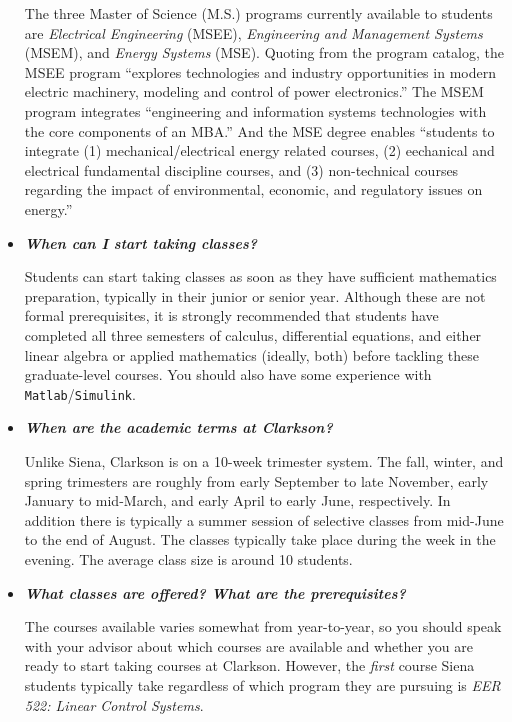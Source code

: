\documentclass[12pt]{article}
\begin{document}
\begin{itemize}
{  The three Master of Science (M.S.) programs currently available to students
  are {\em Electrical Engineering} (MSEE), {\em Engineering and Management
    Systems} (MSEM), and {\em Energy Systems} (MSE).  Quoting from the program
  catalog, the MSEE program ``explores technologies and industry opportunities
  in modern electric machinery, modeling and control of power electronics.''
  The MSEM program integrates ``engineering and information systems technologies
  with the core components of an MBA.''  And the MSE degree enables ``students
  to integrate (1) mechanical/electrical energy related courses, (2) eechanical
  and electrical fundamental discipline courses, and (3) non-technical courses
  regarding the impact of environmental, economic, and regulatory issues on
  energy.''}

\item{{\bf {\em When can I start taking classes?}}

  Students can start taking classes as soon as they have sufficient mathematics
  preparation, typically in their junior or senior year.  Although these are not
  formal prerequisites, it is strongly recommended that students have completed
  all three semesters of calculus, differential equations, and either linear
  algebra or applied mathematics (ideally, both) before tackling these
  graduate-level courses.  You should also have some experience with {\tt
    Matlab}/{\tt Simulink}.}

\item{{\bf {\em When are the academic terms at Clarkson?}}

  Unlike Siena, Clarkson is on a 10-week trimester system.  The fall, winter,
  and spring trimesters are roughly from early September to late November, early
  January to mid-March, and early April to early June, respectively.  In
  addition there is typically a summer session of selective classes from
  mid-June to the end of August.  The classes typically take place during the
  week in the evening.  The average class size is around 10 students.}

\item{{\bf {\em What classes are offered?  What are the prerequisites?}}

  The courses available varies somewhat from year-to-year, so you should speak
  with your advisor about which courses are available and whether you are ready
  to start taking courses at Clarkson.  However, the \emph{first} course Siena
  students typically take regardless of which program they are pursuing is {\em
    EER 522: Linear Control Systems}.}


\end{itemize}
\end{document}
